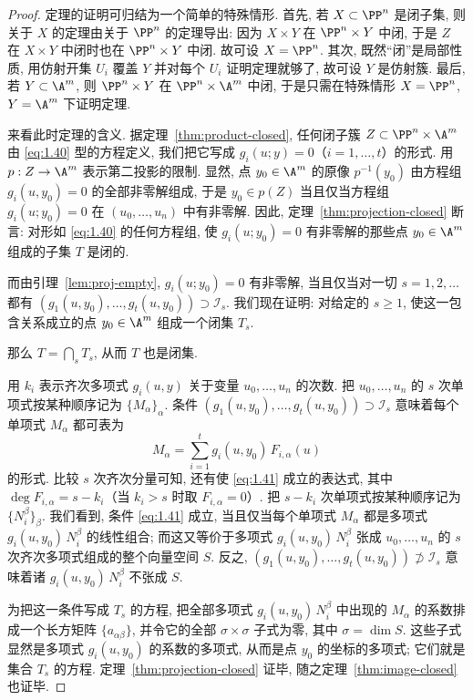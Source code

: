 \begin{proof}
	定理的证明可归结为一个简单的特殊情形. 首先, 若 $X \subset \PP^n$ 是闭子集, 则关于 $X$ 的定理由关于 $\PP^n$ 的定理导出: 因为 $X \times Y$ 在 $\PP^n \times Y$ 中闭, 于是 $Z$ 在 $X \times Y$ 中闭时也在 $\PP^n \times Y$ 中闭. 故可设 $X = \PP^n$. 其次, 既然``闭''是局部性质, 用仿射开集 $U_i$ 覆盖 $Y$ 并对每个 $U_i$ 证明定理就够了, 故可设 $Y$ 是仿射簇. 最后, 若 $Y \subset \A^m$, 则 $\PP^n \times Y$ 在 $\PP^n \times \A^m$ 中闭, 于是只需在特殊情形 $X = \PP^n$, $Y = \A^m$ 下证明定理.

	来看此时定理的含义. 据定理~\ref{thm:product-closed}, 任何闭子簇 $Z \subset \PP^n \times \A^m$ 由 \eqref{eq:1.40} 型的方程定义, 我们把它写成 $g_i(u; y) = 0$（$i = 1, \ldots, t$）的形式. 用 $p: Z \to \A^m$ 表示第二投影的限制. 显然, 点 $y_0 \in \A^m$ 的原像 $p^{-1}(y_0)$ 由方程组 $g_i(u, y_0) = 0$ 的全部非零解组成, 于是 $y_0 \in p(Z)$ 当且仅当方程组 $g_i(u; y_0) = 0$ 在 $(u_0, \ldots, u_n)$ 中有非零解. 因此, 定理~\ref{thm:projection-closed} 断言: 对形如 \eqref{eq:1.40} 的任何方程组, 使 $g_i(u; y_0) = 0$ 有非零解的那些点 $y_0 \in \A^m$ 组成的子集 $T$ 是闭的.

	而由引理~\ref{lem:proj-empty}, $g_i(u; y_0) = 0$ 有非零解, 当且仅当对一切 $s = 1, 2, \ldots$ 都有 $(g_1(u, y_0), \ldots, g_t(u, y_0)) \supset \mathcal I_s$. 我们现在证明: 对给定的 $s \ge 1$, 使这一包含关系成立的点 $y_0 \in \A^m$ 组成一个闭集 $T_s$.

	那么 $T = \bigcap_s T_s$, 从而 $T$ 也是闭集.

	用 $k_i$ 表示齐次多项式 $g_i(u, y)$ 关于变量 $u_0, \ldots, u_n$ 的次数. 把 $u_0, \ldots, u_n$ 的 $s$ 次单项式按某种顺序记为 $\{M_\alpha\}_\alpha$. 条件 $(g_1(u, y_0), \ldots, g_t(u, y_0)) \supset \mathcal I_s$ 意味着每个单项式 $M_\alpha$ 都可表为
	\begin{equation}
		\label{eq:1.41}
		M_\alpha = \sum_{i=1}^{t} g_i(u, y_0)\, F_{i,\alpha}(u)
	\end{equation}
	的形式. 比较 $s$ 次齐次分量可知, 还有使 \eqref{eq:1.41} 成立的表达式, 其中 $\deg F_{i,\alpha} = s - k_i$（当 $k_i > s$ 时取 $F_{i,\alpha} = 0$）. 把 $s - k_i$ 次单项式按某种顺序记为 $\{N^\beta_i\}_\beta$. 我们看到, 条件 \eqref{eq:1.41} 成立, 当且仅当每个单项式 $M_\alpha$ 都是多项式 $g_i(u, y_0)\, N^\beta_i$ 的线性组合; 而这又等价于多项式 $g_i(u, y_0)\, N^\beta_i$ 张成 $u_0, \ldots, u_n$ 的 $s$ 次齐次多项式组成的整个向量空间 $S$. 反之, $(g_1(u, y_0), \ldots, g_t(u, y_0)) \not\supset \mathcal I_s$ 意味着诸 $g_i(u, y_0)\, N^\beta_i$ 不张成 $S$.

	为把这一条件写成 $T_s$ 的方程, 把全部多项式 $g_i(u, y_0)\, N^\beta_i$ 中出现的 $M_\alpha$ 的系数排成一个长方矩阵 $\{a_{\alpha\beta}\}$, 并令它的全部 $\sigma \times \sigma$ 子式为零, 其中 $\sigma = \dim S$. 这些子式显然是多项式 $g_i(u, y_0)$ 的系数的多项式, 从而是点 $y_0$ 的坐标的多项式; 它们就是集合 $T_s$ 的方程. 定理~\ref{thm:projection-closed} 证毕, 随之定理~\ref{thm:image-closed} 也证毕.
\end{proof}

